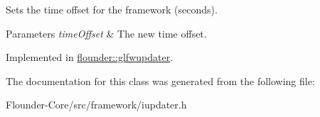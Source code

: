 Sets the time offset for the framework (seconds). 


\begin{DoxyParams}{Parameters}
{\em time\+Offset} & The new time offset. \\
\hline
\end{DoxyParams}


Implemented in \hyperlink{classflounder_1_1glfwupdater_a7dc4371863e39a3a7870e4a2ac539fed}{flounder\+::glfwupdater}.



The documentation for this class was generated from the following file\+:\begin{DoxyCompactItemize}
\item 
Flounder-\/\+Core/src/framework/iupdater.\+h\end{DoxyCompactItemize}
